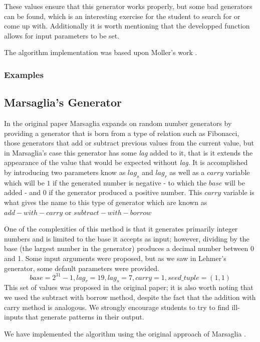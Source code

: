 These values ensure that this generator works properly, but some bad generators can be found, which is an interesting exercise for the student to search for or come up with. Additionally it is worth mentioning that the developped function allows for input parameters to be set.

The algorithm implementation was based upon Moller's work \cite{doi:10.1137/1.9780898717952}.
\subsubsection{Examples}
	


\subsection{Marsaglia's Generator}

In the original paper \cite{10.1214/aoap/1177005878} Marsaglia expands on random number generators by providing a generator that is born from a type of relation such as Fibonacci, those generators that add or subtract previous values from the current value, but in Marsaglia's case this generator has some \textit{lag} added to it, that is it extends the appearance of the value that would be expected without \textit{lag}. It is accomplished by introducing two parameters know as $lag_s$ and $lag_r$ as well as a $carry$ variable which will be $1$ if the generated number is negative - to which the $base$ will be added - and $0$ if the generator produced a positive number. This $carry$ variable is what gives the name to this type of generator which are known as $add-with-carry$ or $subtract-with-borrow$

One of the complexities of this method is that it generates primarily integer numbers and is limited to the base it accepts as input; however, dividing by the base (the largest number in the generator) produces a decimal number between 0 and 1. Some input arguments were proposed, but as we saw in Lehmer's generator, some default parameters were provided. 
\[base = 2^{31}-1, lag_r=19, lag_s=7, carry=1, seed\_tuple = (1,1)\]
This set of values was proposed in the original paper; it is also worth noting that we used the subtract with borrow method, despite the fact that the addition with carry method is analogous. We strongly encourage students to try to find ill-inputs that generate patterns in their output.

We have implemented the algorithm using the original approach of Marsaglia \cite{10.1214/aoap/1177005878}.
